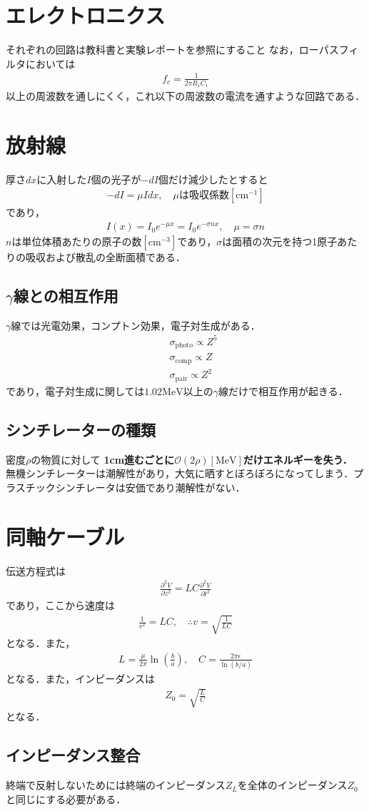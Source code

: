 \documentclass[12pt,dvipdfmx]{jsarticle}
\begin{document}
\section*{\Large{エレクトロニクス}}
それぞれの回路は教科書と実験レポートを参照にすること
なお，ローパスフィルタにおいては
\begin{eqnarray}
  f_c = \frac{1}{2\pi R_1 C_1}
\end{eqnarray}
以上の周波数を通しにくく，これ以下の周波数の電流を通すような回路である．

\section*{\Large{放射線}}
厚さ$dx$に入射した$I$個の光子が$-dI$個だけ減少したとすると
\begin{eqnarray}
  -dI = \mu I dx,\quad \mu は吸収係数[\text{cm}{}^{-1}]
\end{eqnarray}
であり，
\begin{eqnarray}
  I(x) = I_0 e^{-\mu x} = I_0 e^{-\sigma nx},\quad \mu= \sigma n
\end{eqnarray}
$n$は単位体積あたりの原子の数$[\text{cm}{}^{-3}]$であり，$\sigma$は面積の次元を持つ1原子あたりの吸収および散乱の全断面積である．
\subsection*{$\gamma$線との相互作用}
$\gamma$線では光電効果，コンプトン効果，電子対生成がある．
\begin{eqnarray}
  &&\sigma_{\text{photo}} \propto Z^5\\
  &&\sigma_{\text{comp}} \propto Z\\
  &&\sigma_{\text{pair}} \propto Z^2
\end{eqnarray}
であり，電子対生成に関しては$1.02\text{MeV}$以上の$\gamma$線だけで相互作用が起きる．
\subsection*{シンチレーターの種類}
密度$\rho$の物質に対して
\textbf{1cm進むごとに$\mathcal{O}(2\rho)[\text{MeV}]$だけエネルギーを失う．}
無機シンチレーターは潮解性があり，大気に晒すとぼろぼろになってしまう．プラスチックシンチレータは安価であり潮解性がない．
\section*{\Large{同軸ケーブル}}
伝送方程式は
\begin{eqnarray}
  \frac{\partial^2 V}{\partial z^2} = LC\frac{\partial^2 V}{\partial t^2}
\end{eqnarray}
であり，ここから速度は
\begin{eqnarray}
  \frac{1}{v^2} = LC,\quad\therefore v =\sqrt{\frac{1}{LC}}
\end{eqnarray}
となる．また，
\begin{eqnarray}
  L = \frac{\mu}{2\pi}\ln\left(\frac{b}{a}\right),\quad C = \frac{2\pi\epsilon}{\ln(b/a)}
\end{eqnarray}
となる．また，インピーダンスは
\begin{eqnarray}
  Z_0 = \sqrt{\frac{L}{C}}
\end{eqnarray}
となる．
\subsection*{インピーダンス整合}
終端で反射しないためには終端のインピーダンス$Z_L$を全体のインピーダンス$Z_0$と同じにする必要がある．
\end{document}
